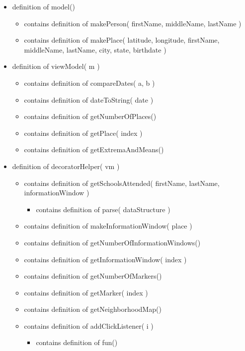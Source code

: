 \documentclass[twoside]{article}
\begin{document}
\begin{itemize}
  \item definition of model()
  \begin{itemize}
    \item contains definition of makePerson( firstName, middleName, lastName )
    \item contains definition of makePlace( latitude, longitude, firstName, middleName, lastName, city, state, birthdate )
    \end{itemize}

  \item definition of viewModel( m )
  \begin{itemize}
    \item contains definition of compareDates( a, b )
    \item contains definition of dateToString( date )
    \item contains definition of getNumberOfPlaces()
    \item contains definition of getPlace( index )
    \item contains definition of getExtremaAndMeans()
    \end{itemize}

  \item definition of decoratorHelper( vm )
  \begin{itemize}
    \item contains definition of getSchoolsAttended( firstName, lastName, informationWindow )
    \begin{itemize}
      \item contains definition of parse( dataStructure )
      \end{itemize}
    \item contains definition of makeInformationWindow( place )
    \item contains definition of getNumberOfInformationWindows()
    \item contains definition of getInformationWindow( index )
    \item contains definition of getNumberOfMarkers()
    \item contains definition of getMarker( index )
    \item contains definition of getNeighborhoodMap()
    \item contains definition of addClickListener( i )
    \begin{itemize}
      \item contains definition of fun()
      \end{itemize}
    \end{itemize}


\end{itemize}
\end{document}

